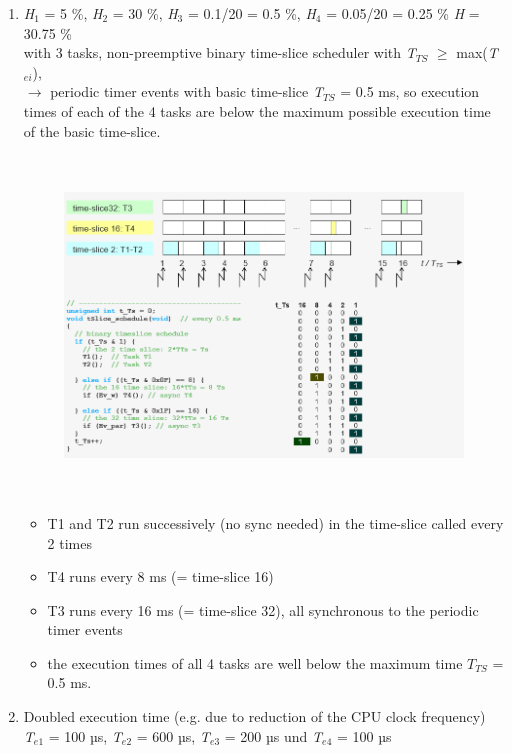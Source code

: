 \begin{enumerate}
\item \textit{H}${}_{1}$ = 5 \%, \textit{H}${}_{2}$ = 30 \%, \textit{H}${}_{3}$ = 0.1/20 = 0.5 \%, \textit{H}${}_{4}$ = 0.05/20 = 0.25 \%  \textit{H} = 30.75 \%\\

with 3 tasks, non-preemptive binary time-slice scheduler with \textit{T${}_{TS}$} $\mathrm{\ge}$ max(\textit{T${}_{ei}$}), \\
$\rightarrow$ periodic timer events with basic time-slice\textit{ T${}_{TS}$} = 0.5 ms, so execution times of each of the 4 tasks are below the maximum possible execution time of the basic time-slice.\\
 
 	\begin{figure}[h]
    \centering
    \includegraphics[width=14cm, height=9cm]{Images/image156.png}
    \label{fig:Fig }
    \end{figure}
    
\begin{itemize}
\item T1 and T2 run successively (no sync needed) in the time-slice called every 2 times
\item T4 runs every 8 ms (= time-slice 16)
\item T3 runs every 16 ms (= time-slice 32), all synchronous to the periodic timer events
\item the execution times of all 4 tasks are well below the maximum time $T_{TS}$ = 0.5 ms.
\end{itemize}
\newpage
\item  Doubled execution time (e.g. due to reduction of the CPU clock frequency)\\  \textit{T}${}_{e1}$ = 100 µs, \textit{T}${}_{e2}$ = 600 µs, \textit{T}${}_{e3}$ = 200 µs und \textit{T}${}_{e4}$ = 100 µs\textit{ }\\


\end{enumerate}
